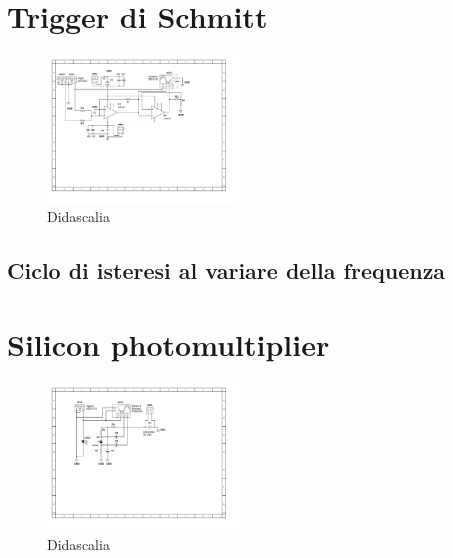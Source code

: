 \documentclass[journal]{IEEEtran}
\begin{document}
\section{Trigger di Schmitt} %

\begin{figure}[H]%
\begin {center}
\includegraphics[width=0.45\textwidth]{sch-simulations/output/OPA-mixer-trigger.pdf}
\caption{Didascalia}
\label{fig:oscilloscope}
\end {center}
\end{figure}

\subsection{Ciclo di isteresi al variare della frequenza} %


\section{Silicon photomultiplier} %

\begin{figure}[H]%
\begin {center}
\includegraphics[width=0.45\textwidth]{sch-simulations/output/SiPM.pdf}
\caption{Didascalia}
\label{fig:oscilloscope}
\end {center}
\end{figure}
\end{document}
